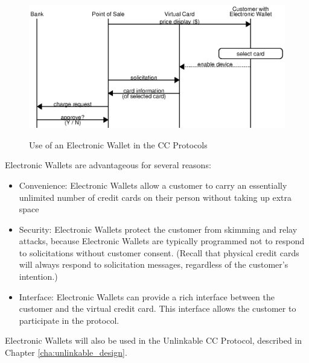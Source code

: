 \begin{figure}[h!]
  \caption{Use of an Electronic Wallet in the CC Protocols}
  \centering
    \includegraphics{img/wallet.eps}
  \label{fig:wallet}
\end{figure}

Electronic Wallets are advantageous for several reasons:
\begin{itemize}
\item Convenience: Electronic Wallets allow a customer to carry an essentially unlimited number of credit cards on their person without taking up extra space
\item Security: Electronic Wallets protect the customer from skimming and relay attacks,
    because Electronic Wallets are typically programmed not to respond to solicitations without customer consent.
    (Recall that physical credit cards will always respond to solicitation messages, regardless of the customer's intention.)
\item Interface: Electronic Wallets can provide a rich interface between the customer and the virtual credit card.
    This interface allows the customer to participate in the protocol.
\end{itemize}

Electronic Wallets will also be used in the Unlinkable CC Protocol, described in Chapter \ref{cha:unlinkable_design}.
